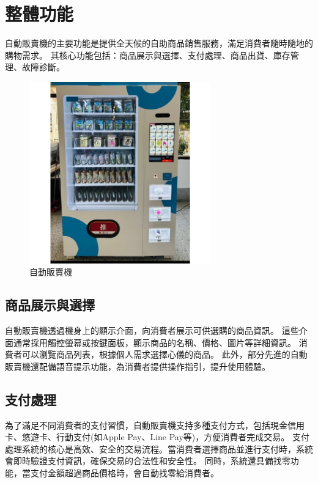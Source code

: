 \documentclass[12pt]{article}       %
\begin{document}
\section{\centering 整體功能}
\hspace{2em}
自動販賣機\cite{csdn_vending_machine_design_2025}的主要功能是提供全天候的自助商品銷售服務，滿足消費者隨時隨地的購物需求。
其核心功能包括：商品展示與選擇、支付處理、商品出貨、庫存管理、故障診斷。
\begin{figure}[H]
    \centering
    \includegraphics[width=0.7\textwidth]{20231108092414cql0q.jpg}     %
    \caption{自動販賣機\cite{chengli_ticket_machine_2025}}    %
    \label{fig:example2}    %
\end{figure} 

\subsection{商品展示與選擇} 
\hspace{2em}
自動販賣機透過機身上的顯示介面，向消費者展示可供選購的商品資訊。
這些介面通常採用觸控螢幕或按鍵面板，顯示商品的名稱、價格、圖片等詳細資訊。
消費者可以瀏覽商品列表，根據個人需求選擇心儀的商品。
此外，部分先進的自動販賣機還配備語音提示功能，為消費者提供操作指引，提升使用體驗。

\subsection{支付處理} 
\hspace{2em}
為了滿足不同消費者的支付習慣，自動販賣機支持多種支付方式，包括現金信用卡、悠遊卡、行動支付(如Apple Pay、Line Pay等)，方便消費者完成交易。
支付處理系統的核心是高效、安全的交易流程。當消費者選擇商品並進行支付時，系統會即時驗證支付資訊，確保交易的合法性和安全性。
同時，系統還具備找零功能，當支付金額超過商品價格時，會自動找零給消費者。
\end{document}
